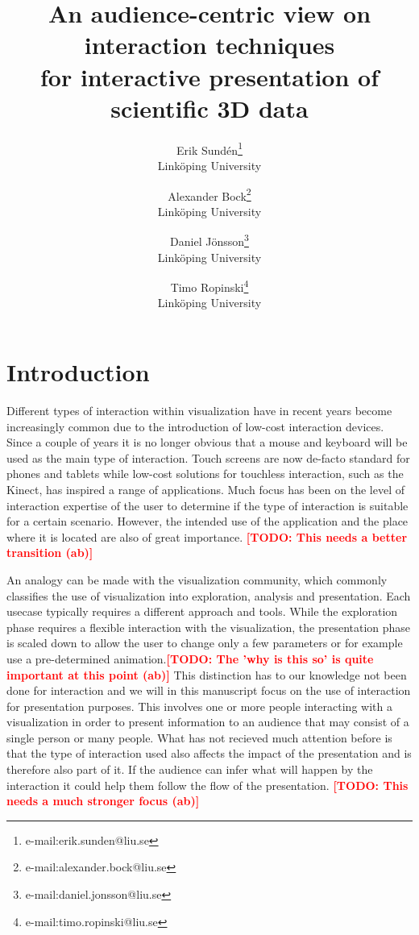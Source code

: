 \documentclass[review,journal]{vgtc}         %
\title{An audience-centric view on interaction techniques \\for interactive presentation of scientific 3D data}
\author{Erik Sund\'en\thanks{e-mail:erik.sunden@liu.se}\\ %
        \scriptsize Link{\"o}ping University %
\and Alexander Bock\thanks{e-mail:alexander.bock@liu.se}\\ %
			   \scriptsize Link{\"o}ping University %
\and Daniel J\"onsson\thanks{e-mail:daniel.jonsson@liu.se}\\ %
          \scriptsize Link{\"o}ping University %
\and Timo Ropinski\thanks{e-mail:timo.ropinski@liu.se}\\ %
           \scriptsize Link{\"o}ping University }
\newcommand{\todo}[1]{\textbf{\textcolor{red}{[TODO: {#1}]}}}
\begin{document}

\maketitle

\section{Introduction}\label{sec:introduction}
Different types of interaction within visualization have in recent years become increasingly common due to the introduction of low-cost interaction devices.
Since a couple of years it is no longer obvious that a mouse and keyboard will be used as the main type of interaction. 
Touch screens are now de-facto standard for phones and tablets while low-cost solutions for touchless interaction, such as the Kinect, has inspired a range of applications. 
Much focus has been on the level of interaction expertise of the user to determine if the type of interaction is suitable for a certain scenario.
However, the intended use of the application and the place where it is located are also of great importance. \todo{This needs a better transition (ab)}

An analogy can be made with the visualization community, which commonly classifies the use of visualization into exploration, analysis and presentation. 
Each usecase typically requires a different approach and tools. 
While the exploration phase requires a flexible interaction with the visualization, 
the presentation phase is scaled down to allow the user to change only a few parameters or for example use a pre-determined animation.\todo{The 'why is this so' is quite important at this point (ab)}
This distinction has to our knowledge not been done for interaction and we will in this manuscript focus on the use of interaction for presentation purposes. 
This involves one or more people interacting with a visualization in order to present information to an audience that may consist of a single person or many people.
What has not recieved much attention before is that the type of interaction used also affects the impact of the presentation and is therefore also part of it. 
If the audience can infer what will happen by the interaction it could help them follow the flow of the presentation. \todo{This needs a much stronger focus (ab)}
\end{document}
